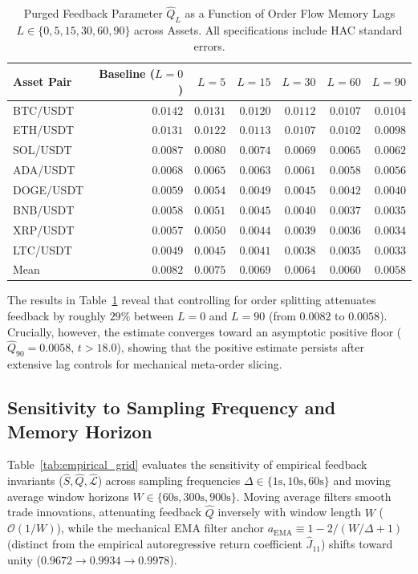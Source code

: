 \documentclass[12pt]{article}
\theoremstyle{definition}
\theoremstyle{remark}
\begin{document}
\begin{table}[htbp]
\centering\footnotesize
\setlength{\tabcolsep}{4pt}
\caption{Purged Feedback Parameter $\hat{Q}_L$ as a Function of Order Flow Memory Lags $L \in \{0, 5, 15, 30, 60, 90\}$ across Assets. All specifications include HAC standard errors.}
\label{tab:lag_memory_controls}
\begin{tabular}{lrrrrrr}\toprule
Asset Pair & Baseline ($L=0$) & $L=5$ & $L=15$ & $L=30$ & $L=60$ & $L=90$ \\\midrule
BTC/USDT & $0.0142$ & $0.0131$ & $0.0120$ & $0.0112$ & $0.0107$ & $0.0104$ \\
ETH/USDT & $0.0131$ & $0.0122$ & $0.0113$ & $0.0107$ & $0.0102$ & $0.0098$ \\
SOL/USDT & $0.0087$ & $0.0080$ & $0.0074$ & $0.0069$ & $0.0065$ & $0.0062$ \\
ADA/USDT & $0.0068$ & $0.0065$ & $0.0063$ & $0.0061$ & $0.0058$ & $0.0056$ \\
DOGE/USDT& $0.0059$ & $0.0054$ & $0.0049$ & $0.0045$ & $0.0042$ & $0.0040$ \\
BNB/USDT & $0.0058$ & $0.0051$ & $0.0045$ & $0.0040$ & $0.0037$ & $0.0035$ \\
XRP/USDT & $0.0057$ & $0.0050$ & $0.0044$ & $0.0039$ & $0.0036$ & $0.0034$ \\
LTC/USDT & $0.0049$ & $0.0045$ & $0.0041$ & $0.0038$ & $0.0035$ & $0.0033$ \\\midrule
Mean     & $0.0082$ & $0.0075$ & $0.0069$ & $0.0064$ & $0.0060$ & $0.0058$ \\\bottomrule
\end{tabular}
\end{table}

The results in Table~\ref{tab:lag_memory_controls} reveal that controlling for order splitting attenuates feedback by roughly $29\%$ between $L=0$ and $L=90$ (from $0.0082$ to $0.0058$). Crucially, however, the estimate converges toward an asymptotic positive floor ($\hat{Q}_{90} = 0.0058$, $t > 18.0$), showing that the positive estimate persists after extensive lag controls for mechanical meta-order slicing.

\subsection{Sensitivity to Sampling Frequency and Memory Horizon}
Table~\ref{tab:empirical_grid} evaluates the sensitivity of empirical feedback invariants ($\hat{S}, \hat{Q}, \hat{\mathcal{L}}$) across sampling frequencies $\Delta \in \{1\text{s}, 10\text{s}, 60\text{s}\}$ and moving average window horizons $W \in \{60\text{s}, 300\text{s}, 900\text{s}\}$. Moving average filters smooth trade innovations, attenuating feedback $\hat{Q}$ inversely with window length $W$ ($\mathcal{O}(1/W)$), while the mechanical EMA filter anchor $a_{\text{EMA}} \equiv 1 - 2/(W/\Delta+1)$ (distinct from the empirical autoregressive return coefficient $\hat{J}_{11}$) shifts toward unity ($0.9672 \to 0.9934 \to 0.9978$).
\end{document}
